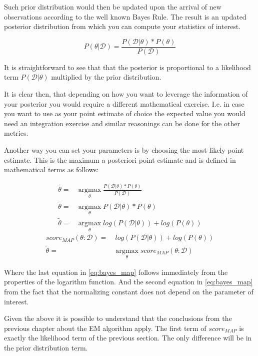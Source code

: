 \documentclass[11pt]{article}
\begin{document}
\begin{article}
Such prior distribution would then be updated upon the arrival of
new observations according to the well known Bayes Rule. The result
is an updated posterior distribution from which you can compute your
statistics of interest.


\begin{equation} \label{eq:bayes_formula}
P (\theta | \mathscr{D}) = \frac{P (\mathscr{D} | \theta) * P(\theta)}{P (\mathscr{D})} 
\end{equation}

It is straightforward to see that that the posterior is proportional
to a likelihood term \(P (\mathscr{D} | \theta)\) multiplied by the
prior distribution.

It is clear then, that depending on how you want to leverage the
information of your posterior you would require a different
mathematical exercise. I.e. in case you want to use as your
point estimate of choice the expected value you would need an
integration exercise and similar reasonings can be done for the
other metrics.

Another way you can set your parameters is by choosing the most
likely point estimate. This is the maximum a posteriori point
estimate and is defined in mathematical terms as follows:

\begin{align} \label{eq:bayes_map}
\tilde{\theta} =& \operatorname*{argmax}_{\theta} \frac{P (\mathscr{D} | \theta) * P(\theta)}{P (\mathscr{D})} \nonumber\\
\tilde{\theta} =& \operatorname*{argmax}_{\theta} P (\mathscr{D} | \theta) * P(\theta)\\ 
\tilde{\theta} =& \operatorname*{argmax}_{\theta} log (P (\mathscr{D} | \theta)) + log (P(\theta)) \nonumber
\end{align}
\begin{align} \label{eq:bayes_map2}
score_{MAP} (\theta : \mathscr{D}) =& \ log (P (\mathscr{D} | \theta)) + log (P(\theta)) \nonumber\\
\tilde{\theta} =& \operatorname*{argmax}_{\theta} score_{MAP}(\theta : \mathscr{D}) 
\end{align}

Where the last equation in \ref{eq:bayes_map} follows immediately
from the properties of the logarithm function. And the second
equation in \ref{eq:bayes_map} from the fact that the normalizing
constant does not depend on the parameter of interest.

Given the above it is possible to understand that the conclusions
from the previous chapter about the EM algorithm apply. The first
term of \(score_{MAP}\) is exactly the likelihood term of the previous
section. The only difference will be in the prior distribution term.


\end{article}
\end{document}
